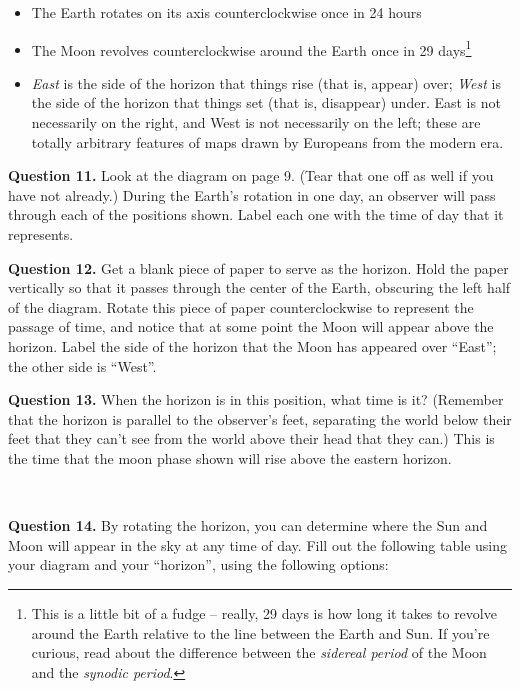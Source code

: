 \documentclass[11pt]{article}
\begin{document}
\begin{itemize}
	\item The Earth rotates on its axis counterclockwise once in 24 hours
	\item The Moon revolves counterclockwise around the Earth once in 29 days\footnote{This is a little bit of a fudge -- really, 29 days is how long it takes to revolve around the Earth relative to the line between the Earth and Sun. If you're curious, read about the difference between the {\it sidereal period} of the Moon and the {\it synodic period}.}
	\item {\it East} is the side of the horizon that things rise (that is, appear) over; {\it West} is the side of the horizon that things set (that is, disappear) under. East is not necessarily on the right, and West is not necessarily on the left; these are totally arbitrary features of maps drawn by Europeans from the modern era.
\end{itemize}


\textbf{Question 11.} Look at the diagram on page 9. (Tear that one off as well if you have not already.) During the Earth's rotation in one day, an observer will pass through each of the positions shown. Label each one with the time of day that it represents.

\textbf{Question 12.} Get a blank piece of paper to serve as the horizon. Hold the paper vertically so that it passes through the center of the Earth, obscuring the left half of the diagram. Rotate this piece of paper counterclockwise to represent the passage of time, and notice that at some point the Moon will appear above the horizon. Label the side of the horizon that the Moon has appeared over ``East''; the other side is ``West''.

\textbf{Question 13.} When the horizon is in this position, what time is it? (Remember that the horizon is parallel to the observer's feet, separating the world below their feet that they can't see from the world above their head that they can.) This is the time that the moon phase shown will rise above the eastern horizon.

\vspace*{1.5cm}

\hrulefill\\
\newpage

\textbf{Question 14.} By rotating the horizon, you can determine where the Sun and Moon will appear in the sky at any time of day. Fill out the following table using your diagram and your ``horizon'', using the following options:
\end{document}
